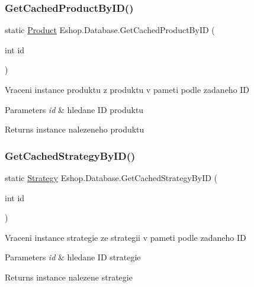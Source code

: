 \subsubsection{\texorpdfstring{GetCachedProductByID()}{GetCachedProductByID()}}
{\footnotesize\ttfamily static \mbox{\hyperlink{class_eshop_1_1_product}{Product}} Eshop.\+Database.\+Get\+Cached\+Product\+By\+ID (\begin{DoxyParamCaption}\item[{int}]{id }\end{DoxyParamCaption})\hspace{0.3cm}{\ttfamily [static]}}



Vraceni instance produktu z produktu v pameti podle zadaneho ID 


\begin{DoxyParams}{Parameters}
{\em id} & hledane ID produktu\\
\hline
\end{DoxyParams}
\begin{DoxyReturn}{Returns}
instance nalezeneho produktu
\end{DoxyReturn}
\mbox{\label{class_eshop_1_1_database_a3dcc471a096b7d40671266fa0853648d}} 
\subsubsection{\texorpdfstring{GetCachedStrategyByID()}{GetCachedStrategyByID()}}
{\footnotesize\ttfamily static \mbox{\hyperlink{class_eshop_1_1_database_entites_1_1_strategy}{Strategy}} Eshop.\+Database.\+Get\+Cached\+Strategy\+By\+ID (\begin{DoxyParamCaption}\item[{int}]{id }\end{DoxyParamCaption})\hspace{0.3cm}{\ttfamily [static]}}



Vraceni instance strategie ze strategii v pameti podle zadaneho ID 


\begin{DoxyParams}{Parameters}
{\em id} & hledane ID strategie\\
\hline
\end{DoxyParams}
\begin{DoxyReturn}{Returns}
instance nalezene strategie
\end{DoxyReturn}
\mbox{\label{class_eshop_1_1_database_ae53edd2dd11678fc40a4594574ebf353}} 

